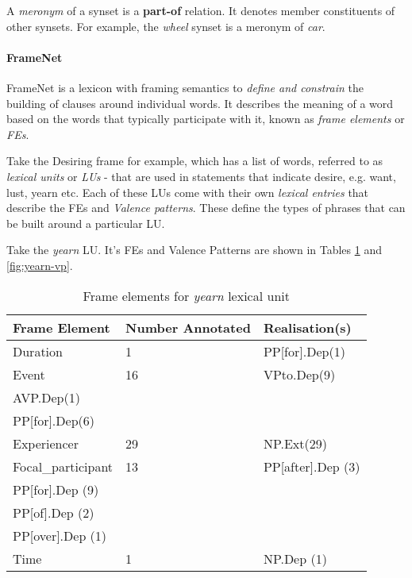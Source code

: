 A \textit{meronym} of a synset is a \textbf{part-of} relation. It denotes member constituents of other synsets. For example, the \textit{wheel} synset is a meronym of \textit{car}.


\paragraph{FrameNet}
\label{sec:fn}
FrameNet\cite{baker1998berkeley} is a lexicon with framing semantics to \textit{define and constrain} the building of clauses around individual words. It describes the meaning of a word based on the words that typically participate with it, known as \textit{frame elements} or \textit{FEs}.

Take the Desiring frame for example, which has a list of words, referred to as \textit{lexical units} or \textit{LUs} - that are used in statements that indicate desire, e.g. want, lust, yearn etc. Each of these LUs come with their own \textit{lexical entries} that describe the FEs and \textit{Valence patterns}. These define the types of phrases that can be built around a particular LU.

Take the \textit{yearn} LU. It's FEs and Valence Patterns are shown in Tables \ref{fig:yearn-fe} and \ref{fig:yearn-vp}.

\begin{table}
    \begin{tabular}{|l|l|l|}
    \hline
    Frame Element      & Number Annotated & Realisation(s)                                                       \\ \hline
    Duration           & 1                & PP[for].Dep(1)                                                       \\ \hline
    Event              & 16               & VPto.Dep(9)\\AVP.Dep(1)\\PP[for].Dep(6)                              \\ \hline
    Experiencer        & 29               & NP.Ext(29)                                                           \\ \hline
    Focal\_participant & 13               & PP[after].Dep (3)\\PP[for].Dep (9)\\PP[of].Dep (2)\\PP[over].Dep (1) \\ \hline
    Time               & 1                & NP.Dep (1)                                                           \\ \hline
    \end{tabular}
    \caption{Frame elements for \textit{yearn} lexical unit}
    \label{fig:yearn-fe}
\end{table}

